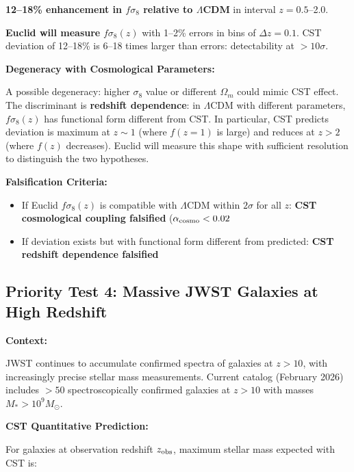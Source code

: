 \documentclass[11pt,a4paper]{article}
\providecommand{\tightlist}{\setlength{\itemsep}{0pt}\setlength{\parskip}{0pt}}
\begin{document}
\textbf{12--18\% enhancement in \(f\sigma_8\) relative to
\(\Lambda\)CDM} in interval \(z = 0.5\)--2.0.

\textbf{Euclid will measure} \(f\sigma_8(z)\) with 1--2\% errors in bins
of \(\Delta z = 0.1\). CST deviation of 12--18\% is 6--18 times larger
than errors: detectability at \(> 10\sigma\).

\textbf{Degeneracy with Cosmological Parameters:}

A possible degeneracy: higher \(\sigma_8\) value or different
\(\Omega_m\) could mimic CST effect. The discriminant is
\textbf{redshift dependence}: in \(\Lambda\)CDM with different
parameters, \(f\sigma_8(z)\) has functional form different from CST. In
particular, CST predicts deviation is maximum at \(z \sim 1\) (where
\(f(z=1)\) is large) and reduces at \(z > 2\) (where \(f(z)\)
decreases). Euclid will measure this shape with sufficient resolution to
distinguish the two hypotheses.

\textbf{Falsification Criteria:}

\begin{itemize}
\tightlist
\item
  If Euclid \(f\sigma_8(z)\) is compatible with \(\Lambda\)CDM within
  \(2\sigma\) for all \(z\): \textbf{CST cosmological coupling
  falsified} (\(\alpha_{\rm cosmo} < 0.02\)
\item
  If deviation exists but with functional form different from predicted:
  \textbf{CST redshift dependence falsified}
\end{itemize}

\hypertarget{priority-test-4-massive-jwst-galaxies-at-high-redshift}{%
\subsection{Priority Test 4: Massive JWST Galaxies at High
Redshift}\label{priority-test-4-massive-jwst-galaxies-at-high-redshift}}

\textbf{Context:}

JWST continues to accumulate confirmed spectra of galaxies at
\(z > 10\), with increasingly precise stellar mass measurements. Current
catalog (February 2026) includes \(> 50\) spectroscopically confirmed
galaxies at \(z > 10\) with masses \(M_* > 10^9 M_\odot\).

\textbf{CST Quantitative Prediction:}

For galaxies at observation redshift \(z_{\rm obs}\), maximum stellar
mass expected with CST is:
\end{document}
